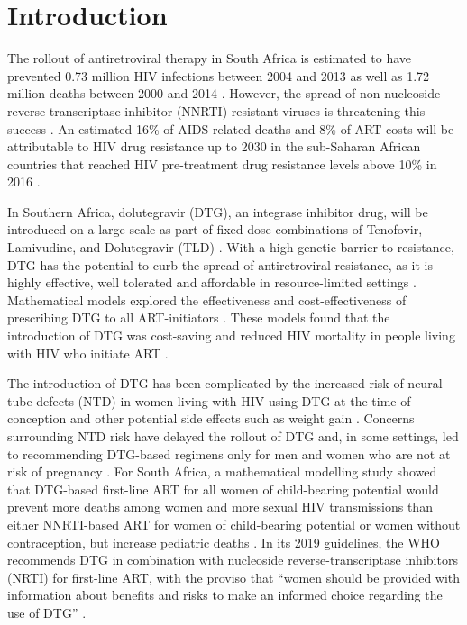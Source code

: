 \documentclass[10pt,letterpaper]{article}
\providecommand{\DIFdelbegin}{} %
\providecommand{\DIFdelend}{} %
\newcommand{\DIFscaledelfig}{0.5}
\newlength{\DIFdelgraphicswidth} %
\newlength{\DIFdelgraphicsheight} %
\newcommand{\DIFdelincludegraphics}[2][]{%
\sbox{\DIFdelgraphicsbox}{\DIFOincludegraphics[#1]{#2}}%
\settoboxwidth{\DIFdelgraphicswidth}{\DIFdelgraphicsbox} %
\settoboxtotalheight{\DIFdelgraphicsheight}{\DIFdelgraphicsbox} %
\scalebox{\DIFscaledelfig}{%
\parbox[b]{\DIFdelgraphicswidth}{\usebox{\DIFdelgraphicsbox}\\[-\baselineskip] \rule{\DIFdelgraphicswidth}{0em}}\llap{\resizebox{\DIFdelgraphicswidth}{\DIFdelgraphicsheight}{%
\setlength{\unitlength}{\DIFdelgraphicswidth}%
\begin{picture}(1,1)%
\thicklines\linethickness{2pt} %
{\color[rgb]{1,0,0}\put(0,0){\framebox(1,1){}}}%
{\color[rgb]{1,0,0}\put(0,0){\line( 1,1){1}}}%
{\color[rgb]{1,0,0}\put(0,1){\line(1,-1){1}}}%
\end{picture}%
}\hspace*{3pt}}} %
} %
\DeclareRobustCommand{\DIFdelbegin}{\DIFOdelbegin \let\includegraphics\DIFdelincludegraphics} %
\DeclareRobustCommand{\DIFdelend}{\DIFOaddend \let\includegraphics\DIFOincludegraphics} %
\begin{document}
\linenumbers
\DIFdelbegin %

\DIFdelend \section*{Introduction}
The rollout of antiretroviral therapy in South Africa is estimated to have prevented 0.73 million HIV infections between 2004 and 2013 as well as 1.72 million deaths between 2000 and 2014 \cite{Heaton2015,Johnson2017a}. However, the spread of non-nucleoside reverse transcriptase inhibitor (NNRTI) resistant viruses is threatening this success \cite{Chimukangara2019b}. An estimated 16\% of AIDS-related deaths and 8\% of ART costs will be attributable to HIV drug resistance up to 2030 in the sub-Saharan African countries that reached HIV pre-treatment drug resistance levels above 10\% in 2016 \cite{Phillips2017}.

In Southern Africa, dolutegravir (DTG), an integrase inhibitor drug, will be introduced on a large scale as part of fixed-dose combinations of Tenofovir, Lamivudine, and Dolutegravir (TLD) \cite{SouthAfricaNationalDepartmentofHealth2018}. With a high genetic barrier to resistance, DTG has the potential to curb the spread of antiretroviral resistance, as it is highly effective, well tolerated and affordable in resource-limited settings \cite{Inzaule2019b,Goh2019,Tang2012,Venter2019}. Mathematical models explored the effectiveness and cost-effectiveness of prescribing DTG to all ART-initiators \cite{Phillips2018}. These models found that the introduction of DTG was cost-saving and reduced HIV mortality in people living with HIV who initiate ART \cite{Phillips2018}.

The introduction of DTG has been complicated by the increased risk of neural tube defects (NTD) in women living with HIV using DTG at the time of conception \cite{WHO_dtg} and other potential side effects such as weight gain \cite{Group2019,Venter2019}. Concerns surrounding NTD risk have delayed the rollout of DTG and, in some settings, led to recommending DTG-based regimens only for men and women who are not at risk of pregnancy \cite{Zash2019,dtg_saphra}. For South Africa, a mathematical modelling study showed that DTG-based first-line ART for all women of child-bearing potential would prevent more deaths among women and more sexual HIV transmissions than either NNRTI-based ART for women of child-bearing potential or women without contraception, but increase pediatric deaths \cite{Dugdale2019}. In its 2019 guidelines, the WHO recommends DTG in combination with nucleoside reverse-transcriptase inhibitors (NRTI) for first-line ART, with the proviso that “women should be provided with information about benefits and risks to make an informed choice regarding the use of DTG” \cite{WHO2019}. 
\end{document}

